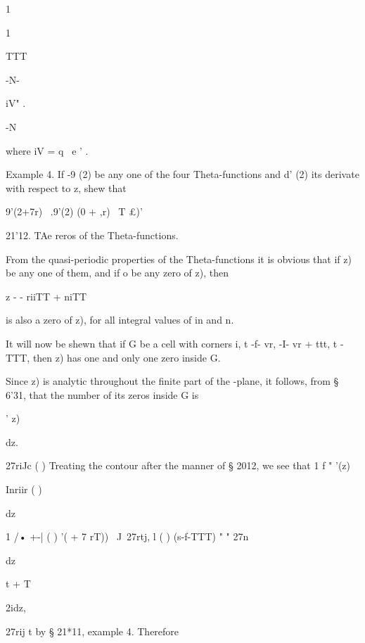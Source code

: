 1 


1 


TTT 


-N- 


iV" . 


-N 



where iV = q~ e '  . 

Example 4. If -9 (2) be any one of the four Theta-functions and d' (2) its derivate with 
respect to z, shew that 



 9'(2+7r) \ .9'(2) 
 (0 + ,r) ~T £)' 






21'12. TAe  reros of the Theta-functions. 

From the quasi-periodic properties of the Theta-functions it is obvious 
that if    z) be any one of them, and if  o be any zero of    z), then 

z  - - riiTT + niTT 

is also a zero of    z), for all integral values of in and n. 

It will now be shewn that if G be a cell with corners i, t -f- vr,   -I- vr + ttt, 
t -  TTT, then    z) has one and only one zero inside G. 

Since    z) is analytic throughout the finite part of the  -plane, it follows, 
from § 6'31, that the number of its zeros inside G is 



 ' z) 



dz. 



27riJc  ( ) 
Treating the contour after the manner of § 2012, we see that 
1 f " '(z) 



Inriir   ( ) 



dz 



1 /• +-| ( )  '(  + 7 rT)) \ J\  
27rtj, l ( )  (s-f-TTT)  " "  27n 






dz 



t + T 



2idz, 



27rij t 
by § 21*11, example 4. Therefore 

